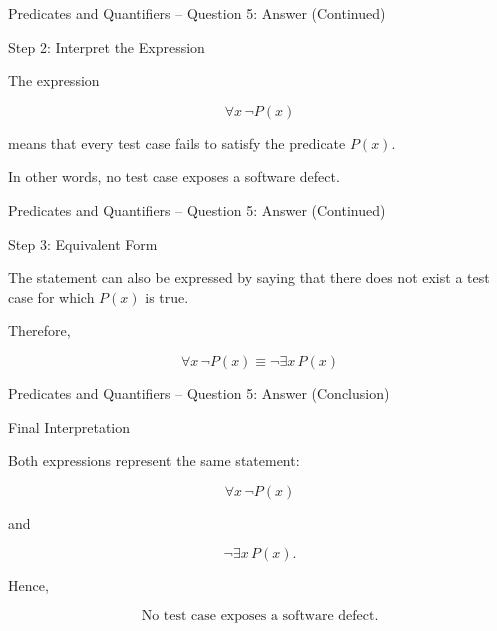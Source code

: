 \begin{frame}{Predicates and Quantifiers -- Question 5: Answer (Continued)}

\begin{exampleblock}{Step 2: Interpret the Expression}

The expression

$$
\forall x\,\neg P(x)
$$

means that every test case fails to satisfy the predicate $P(x)$.

In other words, no test case exposes a software defect.

\end{exampleblock}

\end{frame}


\begin{frame}{Predicates and Quantifiers -- Question 5: Answer (Continued)}

\begin{exampleblock}{Step 3: Equivalent Form}

The statement can also be expressed by saying that there does not
exist a test case for which $P(x)$ is true.

Therefore,

$$
\boxed{\forall x\,\neg P(x)
\equiv
\neg\exists x\,P(x)}
$$

\end{exampleblock}

\end{frame}


\begin{frame}{Predicates and Quantifiers -- Question 5: Answer (Conclusion)}

\begin{exampleblock}{Final Interpretation}

Both expressions represent the same statement:

$$
\forall x\,\neg P(x)
$$

and

$$
\neg\exists x\,P(x).
$$

Hence,

$$
\boxed{\text{No test case exposes a software defect.}}
$$

\end{exampleblock}

\end{frame}
